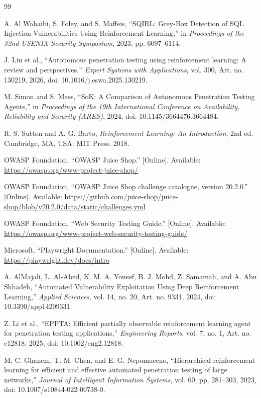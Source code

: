 \documentclass[conference, a4paper]{IEEEtran}
\begin{document}
\begin{thebibliography}{99}

A. Al Wahaibi, S. Foley, and S. Maffeis,
``SQIRL: Grey-Box Detection of SQL Injection Vulnerabilities
Using Reinforcement Learning,''
in \textit{Proceedings of the 32nd USENIX Security Symposium},
2023, pp. 6097--6114.

J. Liu et al.,
``Autonomous penetration testing using reinforcement learning:
A review and perspectives,''
\textit{Expert Systems with Applications},
vol. 300, Art. no. 130219, 2026,
doi: 10.1016/j.eswa.2025.130219.

M. Simon and S. Mees,
``SoK: A Comparison of Autonomous Penetration Testing Agents,''
in \textit{Proceedings of the 19th International Conference on
Availability, Reliability and Security (ARES)}, 2024,
doi: 10.1145/3664476.3664484.

R. S. Sutton and A. G. Barto,
\textit{Reinforcement Learning: An Introduction},
2nd ed. Cambridge, MA, USA: MIT Press, 2018.

OWASP Foundation,
``OWASP Juice Shop.''
[Online]. Available:
\url{https://owasp.org/www-project-juice-shop/}

OWASP Foundation,
``OWASP Juice Shop challenge catalogue, version 20.2.0.''
[Online]. Available:
\url{https://github.com/juice-shop/juice-shop/blob/v20.2.0/data/static/challenges.yml}

OWASP Foundation,
``Web Security Testing Guide.''
[Online]. Available:
\url{https://owasp.org/www-project-web-security-testing-guide/}

Microsoft,
``Playwright Documentation.''
[Online]. Available:
\url{https://playwright.dev/docs/intro}

A. AlMajali, L. Al-Abed, K. M. A. Yousef,
B. J. Mohd, Z. Samamah, and A. Abu Shhadeh,
``Automated Vulnerability Exploitation Using Deep Reinforcement
Learning,''
\textit{Applied Sciences},
vol. 14, no. 20, Art. no. 9331, 2024,
doi: 10.3390/app14209331.

Z. Li et al.,
``EPPTA: Efficient partially observable reinforcement learning
agent for penetration testing applications,''
\textit{Engineering Reports},
vol. 7, no. 1, Art. no. e12818, 2025,
doi: 10.1002/eng2.12818.

M. C. Ghanem, T. M. Chen, and E. G. Nepomuceno,
``Hierarchical reinforcement learning for efficient and effective
automated penetration testing of large networks,''
\textit{Journal of Intelligent Information Systems},
vol. 60, pp. 281--303, 2023,
doi: 10.1007/s10844-022-00738-0.

\end{thebibliography}
\end{document}
